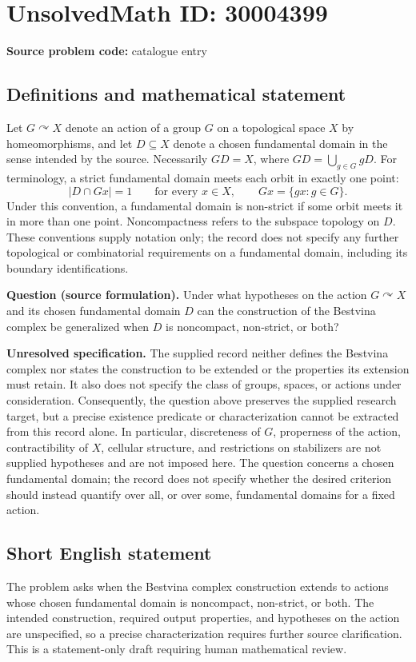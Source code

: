 \documentclass[11pt]{article}
\begin{document}
\section*{UnsolvedMath ID: 30004399}
\textbf{Source problem code:} catalogue entry
\subsection{Definitions and mathematical statement}
Let \(G\curvearrowright X\) denote an action of a group \(G\) on a topological space \(X\) by homeomorphisms, and let \(D\subseteq X\) denote a chosen fundamental domain in the sense intended by the source. Necessarily \(G D=X\), where \(G D=\bigcup_{g\in G}gD\). For terminology, a strict fundamental domain meets each orbit in exactly one point:
\[
\lvert D\cap Gx\rvert=1\qquad\text{for every }x\in X,
\qquad Gx=\{gx:g\in G\}.
\]
Under this convention, a fundamental domain is non-strict if some orbit meets it in more than one point. Noncompactness refers to the subspace topology on \(D\). These conventions supply notation only; the record does not specify any further topological or combinatorial requirements on a fundamental domain, including its boundary identifications.

\textbf{Question (source formulation).} Under what hypotheses on the action \(G\curvearrowright X\) and its chosen fundamental domain \(D\) can the construction of the Bestvina complex be generalized when \(D\) is noncompact, non-strict, or both?

\textbf{Unresolved specification.} The supplied record neither defines the Bestvina complex nor states the construction to be extended or the properties its extension must retain. It also does not specify the class of groups, spaces, or actions under consideration. Consequently, the question above preserves the supplied research target, but a precise existence predicate or characterization cannot be extracted from this record alone. In particular, discreteness of \(G\), properness of the action, contractibility of \(X\), cellular structure, and restrictions on stabilizers are not supplied hypotheses and are not imposed here. The question concerns a chosen fundamental domain; the record does not specify whether the desired criterion should instead quantify over all, or over some, fundamental domains for a fixed action.
\subsection{Short English statement}
The problem asks when the Bestvina complex construction extends to actions whose chosen fundamental domain is noncompact, non-strict, or both. The intended construction, required output properties, and hypotheses on the action are unspecified, so a precise characterization requires further source clarification. This is a statement-only draft requiring human mathematical review.
\end{document}
